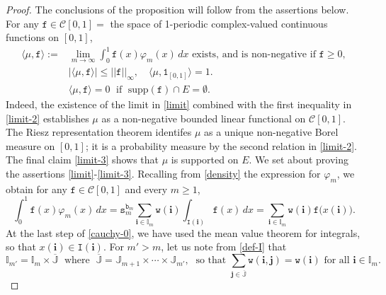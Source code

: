 \documentclass[12pt, twoside]{article}
\theoremstyle{definition}
\numberwithin{equation}{section}
\begin{document}
\begin{proof} 
The conclusions of the proposition will follow from the assertions below. For any $\mathtt f \in \mathcal C[0,1]=$ the space of 1-periodic complex-valued continuous functions on $[0,1]$,
\begin{align} 
\langle \mu, \mathtt f \rangle :=  &\lim_{m \rightarrow \infty} \int_{0}^{1} \mathtt f(x) \varphi_m(x) \, dx \text{ exists, and is non-negative if } \mathtt f \geq 0, \label{limit} \\ 
&\bigl| \langle \mu, \mathtt f \rangle \bigr| \leq || \mathtt f || _{\infty}, \quad  \langle \mu, \mathtt 1_{[0,1]} \rangle = 1. \label{limit-2} \\
&  \langle \mu, \mathtt f \rangle = 0 \; \text{ if } \; \text{supp}(\mathtt f) \cap E = \emptyset. \label{limit-3}
\end{align} 
Indeed, the existence of the limit in \eqref{limit} combined with the first inequality in \eqref{limit-2} establishes $\mu$ as a non-negative bounded linear functional on $\mathcal C[0,1]$. The Riesz representation theorem identifes $\mu$ as a unique non-negative Borel measure on $[0,1]$; it is a probability measure by the second relation in \eqref{limit-2}. The final claim \eqref{limit-3} shows that $\mu$ is supported on $E$. 
\vskip0.1in 
\noindent We set about proving the assertions \eqref{limit}-\eqref{limit-3}.  Recalling from \eqref{density} the expression for $\varphi_m$, we obtain for any $\mathtt f \in \mathcal C[0,1]$ and every $m \geq 1$,   
\begin{equation} \label{cauchy-0}
\int_{0}^{1} \mathtt f(x) \varphi_m(x) \, dx = \mathtt s_m^{\mathtt b_m} \sum_{\mathbf i \in \mathbb I_m} \mathtt w(\mathbf i) \int_{\mathtt I(\mathbf i)} \mathtt f(x) \, dx = \sum_{\mathbf i \in \mathbb I_m} \mathtt w(\mathbf i) \mathtt f\bigl(x(\mathbf i)\bigr).
\end{equation} 
At the last step of \eqref{cauchy-0}, we have used the mean value theorem for integrals, so that $x(\mathbf i) \in \mathtt I(\mathbf i)$. 
For $m' > m$, let us note from \eqref{def-I} that 
\[ \mathbb I_{m'} = \mathbb I_m \times \overline{\mathbb J} \; \text{ where } \; \overline{\mathbb J} = \mathbb J_{m+1} \times \cdots \times \mathbb J_{m'}, \; \text{ so that } \sum_{\mathbf j \in \overline{\mathbb J}} \mathtt w(\mathbf i, \mathbf j) = \mathtt w(\mathbf i) \text{ for all } \mathbf i \in \mathbb I_m. \] 

\end{proof}
\end{document}
